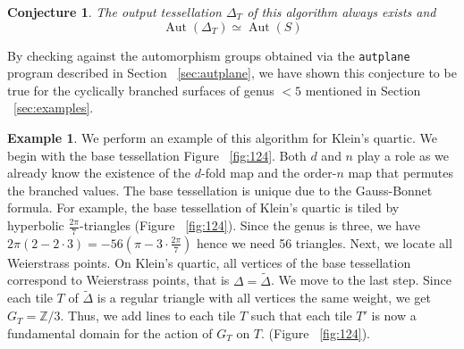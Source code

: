 \documentclass[12pt,reqno]{amsart}
\DeclareMathOperator{\Aut}{Aut}
\newcommand{\Z}{\mathbb{Z}}
\newcommand{\R}{\mathbb{R}}
\newtheorem{conjecture}[theorem]{Conjecture}
\theoremstyle{definition}
\newtheorem{example}[theorem]{Example}
\theoremstyle{remark}
\newcommand{\ti}{\todo[inline]}
\begin{document}
\begin{conjecture} \label{tessconj}
The output tessellation $\Delta_T$ of this algorithm always exists and $$\Aut(\Delta_T) \simeq \Aut(S)$$
\end{conjecture}

By checking against the automorphism groups obtained via the \texttt{autplane} program described in Section ~\ref{sec:autplane}, we have shown this conjecture to be true for the cyclically branched surfaces of genus $< 5$ mentioned in Section ~\ref{sec:examples}.




\begin{example}
We perform an example of this algorithm for Klein's quartic. We begin with the base tessellation Figure~ \cref{fig:124}. Both $d$ and $n$ play a role as we already know the existence of the $d$-fold map and the order-$n$ map that permutes the branched values. The base tessellation is unique due to the Gauss-Bonnet formula. For example, the base tessellation of Klein's quartic is tiled by hyperbolic $\frac{2 \pi}{7}$-triangles (Figure~ \cref{fig:124}). Since the genus is three, we have $2 \pi (2 - 2 \cdot 3) = -56 (\pi - 3 \cdot \frac{2 \pi}{7})$ hence we need 56 triangles. Next, we locate all Weierstrass points. On Klein's quartic, all vertices of the base tessellation correspond to Weierstrass points, that is $\Delta = \widetilde{\Delta}$. We move to the last step. Since each tile $T$ of $\widetilde{\Delta}$ is a regular triangle with all vertices the same weight, we get $G_T = \Z/3$. Thus, we add lines to each tile $T$ such that each tile $T'$ is now a fundamental domain for the action of $G_T$ on $T$. (Figure~ \cref{fig:124}).


 \end{example}
\end{document}

